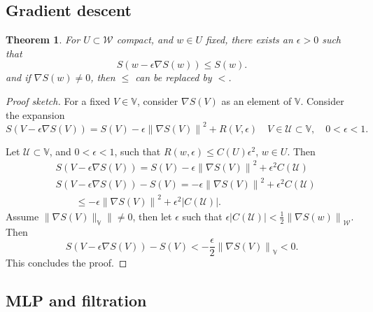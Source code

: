 \documentclass[10pt, a4paper]{article}
\theoremstyle{plain}
\newtheorem{theorem}{Theorem}[section]
\theoremstyle{definition}
\theoremstyle{definition}
\theoremstyle{definition}
\theoremstyle{definition}
\theoremstyle{definition}
\theoremstyle{definition}
\theoremstyle{definition}
\theoremstyle{remark}
\theoremstyle{remark}
\theoremstyle{rudin-style-generic}
\theoremstyle{rudin-style-generic*}
\theoremstyle{rudin-style-theorem}
\begin{document}
\subsection{Gradient descent}

\begin{theorem}
	For $U\subset\mathcal W$ compact, and $w\in U$ fixed,
	there exists an $\epsilon>0$ such that
	$$
	S(w-\epsilon\nabla S(w)) \le S(w)
	.
	$$
	and if $\nabla S(w)\ne 0$, then $\le$ can be replaced by $<$.
\end{theorem}
\begin{proof}[Proof sketch]
For a fixed $V\in\mathbb V$, consider $\nabla S(V)$ as an element of $\mathbb V$.
Consider the expansion
$$
S(V-\epsilon\nabla S(V)) = S(V) - \epsilon {\|\nabla S(V)\|}^2 + R(V,\epsilon)
\quad V\in \mathcal U\subset\mathbb V,\quad 0<\epsilon<1
.
$$

Let
$\mathcal U \subset \mathbb V$, and $0<\epsilon<1$, such that  $R(w, \epsilon) \le C(U) \epsilon^2$, $w\in U$.
Then
\begin{align*}
	&S(V - \epsilon \nabla S(V) ) = S(V) - \epsilon {\| \nabla S(V) \|}^2  + \epsilon^2 C(\mathcal U)\\
	&S(V - \epsilon \nabla S(V) )  - S(V)  = -\epsilon {\| \nabla S(V) \|}^2+ \epsilon^2 C(\mathcal U)\\
	&\qquad \le -\epsilon  {\| \nabla S(V) \|}^2 + \epsilon^2 |C(\mathcal U)|
	.
\end{align*}
Assume $\|\nabla S(V)\|_{\mathbb V}\| \ne 0$, then
let $\epsilon$ such that $\epsilon|C(\mathcal U)| < \frac12 {\|\nabla S(w)\|}_{\mathcal W}$.
Then 
\begin{equation*}
	S(V - \epsilon \nabla S(V) )  - S(V) < -\frac{\epsilon}{2} {\|\nabla S(V)\|}_{\mathbb V} < 0
		.
\end{equation*}
 This concludes the proof.
\end{proof}


\subsection{MLP and filtration}
\label{sec:mlp-filtration}


\end{document}
